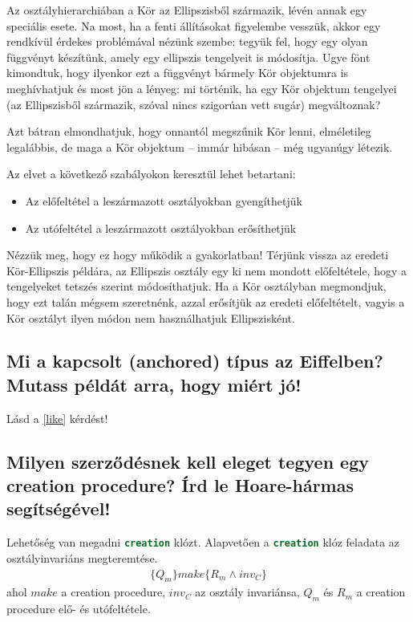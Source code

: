 	Az osztályhierarchiában a Kör az Ellipszisből származik, lévén annak egy speciális esete. Na most, ha a fenti állításokat figyelembe vesszük, akkor egy rendkívül érdekes problémával nézünk szembe: tegyük fel, hogy egy olyan függvényt készítünk, amely egy ellipszis tengelyeit is módosítja. Ugye fönt kimondtuk, hogy ilyenkor ezt a függvényt bármely Kör objektumra is meghívhatjuk és most jön a lényeg: mi történik, ha egy Kör objektum tengelyei (az Ellipszisből származik, szóval nincs szigorúan vett sugár) megváltoznak?
	
	Azt bátran elmondhatjuk, hogy onnantól megszűnik Kör lenni, elméletileg legalábbis, de maga a Kör objektum – immár hibásan – még ugyanúgy létezik.
	
	Az elvet a következő szabályokon keresztül lehet betartani:
	\begin{itemize}
		\item Az előfeltétel a leszármazott osztályokban gyengíthetjük
		
		\item Az utófeltétel a leszármazott osztályokban erősíthetjük
	\end{itemize}
	
	Nézzük meg, hogy ez hogy működik a gyakorlatban! Térjünk vissza az eredeti Kör-Ellipszis példára, az Ellipszis osztály egy ki nem mondott előfeltétele, hogy a tengelyeket tetszés szerint módosíthatjuk. Ha a Kör osztályban megmondjuk, hogy ezt talán mégsem szeretnénk, azzal erősítjük az eredeti előfeltételt, vagyis a Kör osztályt ilyen módon nem használhatjuk Ellipszisként.

\subsection{Mi a kapcsolt (anchored) típus az Eiffelben? Mutass példát arra, hogy miért jó!}
	Lásd a \ref{like} kérdést!
	
\subsection{ Milyen szerződésnek kell eleget tegyen egy creation procedure? Írd le Hoare-hármas segítségével! }
	Lehetőség van megadni \lstinline[language=Eiffel]|creation| klózt. Alapvetően a \lstinline[language=Eiffel]|creation| klóz feladata az osztályinvariáns megteremtése.
	\begin{align*}
		\{Q_m\}make\{R_m\wedge inv_C\}
	\end{align*}
	ahol $make$ a creation procedure, $inv_C$ az osztály invariánsa, $Q_m$ és $R_m$ a creation procedure elő- és utófeltétele.
	
